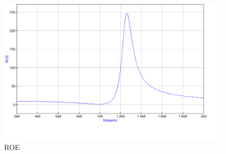 \documentclass{article}
\begin{document}
\begin{figure}[h!]
	\begin{center}
	\includegraphics[width=\linewidth]{images/sim_roe.png}
	\end{center}
	\caption{ROE}
	\label{fig:imagem1}
\end{figure}
\end{document}
